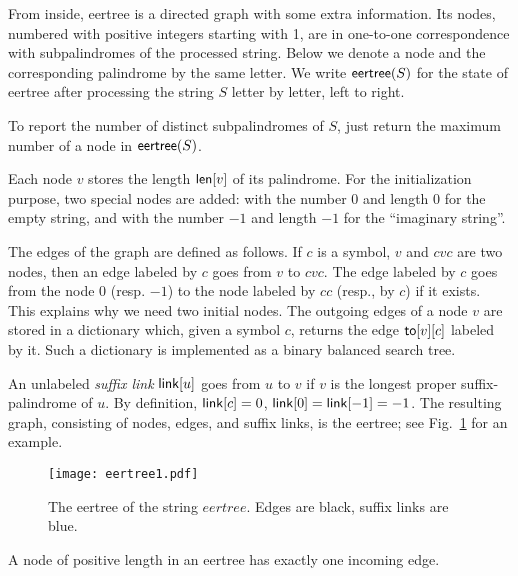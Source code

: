 \documentclass{llncs}
\def\eertree{{\sf eertree}}
\def\len{{\sf len}}
\def\link{{\sf link}}
\def\go{{\sf to}}
\begin{document}
From inside, eertree is a directed graph with some extra information. Its nodes, numbered with positive integers starting with 1, are in one-to-one correspondence with subpalindromes of the processed string. Below we denote a node and the corresponding palindrome by the same letter. We write $\eertree(S)$ for the state of eertree after processing the string $S$ letter by letter, left to right.

\begin{remark}
To report the number of distinct subpalindromes of $S$, just return the maximum number of a node in $\eertree(S)$.
\end{remark}

Each node $v$ stores the length $\len[v]$ of its palindrome. For the initialization purpose, two special nodes are added: with the number $0$ and length $0$ for the empty string, and with the number $-1$ and length $-1$ for the ``imaginary string''. 

The edges of the graph are defined as follows. If $c$ is a symbol, $v$ and $cvc$ are two nodes, then an edge labeled by $c$ goes from $v$ to $cvc$. The edge labeled by $c$ goes from the node $0$ (resp. $-1$) to the node labeled by $cc$ (resp., by $c$) if it exists. This explains why we need two initial nodes. The outgoing edges of a node $v$ are stored in a dictionary which, given a symbol $c$, returns the edge $\go[v][c]$ labeled by it. Such a dictionary is implemented as a binary balanced search tree. 

An unlabeled \emph{suffix link} $\link[u]$ goes from $u$ to $v$ if $v$ is the longest proper suffix-palindrome of $u$. By definition, $\link[c]=0$, $\link[0]=\link[{-}1]={-}1$. The resulting graph, consisting of nodes, edges, and suffix links, is the eertree; see Fig.~\ref{fig:eertree} for an example. 

\begin{figure}[hbt!]
\vspace*{-4mm}
\centering
\texttt{[image: eertree1.pdf]}
\vspace*{-1mm}
\caption{The eertree of the string $eertree$. Edges are black, suffix links are blue.}
\label{fig:eertree}
\end{figure}



\begin{lemma}\label{oneEdge}
A node of positive length in an eertree has exactly one incoming edge.
\end{lemma}
\end{document}
